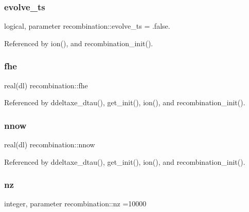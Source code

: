 \subsubsection{\texorpdfstring{evolve\+\_\+ts}{evolve\_ts}}
{\footnotesize\ttfamily logical, parameter recombination\+::evolve\+\_\+ts = .false.\hspace{0.3cm}{\ttfamily [private]}}



Referenced by ion(), and recombination\+\_\+init().

\mbox{\label{namespacerecombination_a0bcf491993bc386ebe7e2f6fafe228a3}} 
\subsubsection{\texorpdfstring{fhe}{fhe}}
{\footnotesize\ttfamily real(dl) recombination\+::fhe\hspace{0.3cm}{\ttfamily [private]}}



Referenced by ddeltaxe\+\_\+dtau(), get\+\_\+init(), ion(), and recombination\+\_\+init().

\mbox{\label{namespacerecombination_a9c154008489ae26b92e9e4b41df00e80}} 
\subsubsection{\texorpdfstring{nnow}{nnow}}
{\footnotesize\ttfamily real(dl) recombination\+::nnow\hspace{0.3cm}{\ttfamily [private]}}



Referenced by ddeltaxe\+\_\+dtau(), get\+\_\+init(), ion(), and recombination\+\_\+init().

\mbox{\label{namespacerecombination_a2ebf98b22953bfe18fb372dd8e330d3e}} 
\subsubsection{\texorpdfstring{nz}{nz}}
{\footnotesize\ttfamily integer, parameter recombination\+::nz =10000\hspace{0.3cm}{\ttfamily [private]}}




